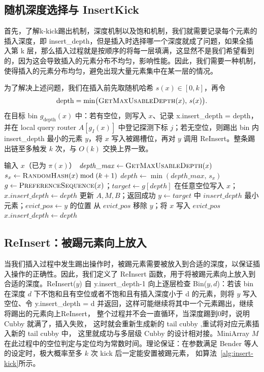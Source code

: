 \subsection{随机深度选择与 InsertKick}

首先，了解k-kick踢出机制，深度机制以及饱和机制，我们就需要记录每个元素的插入深度，即 insert\_depth，但是插入时选择哪一个深度就成了问题，如果全插入第 k 层，那么插入过程就是按顺序的将每一层填满，这显然不是我们希望看到的，因为这会导致插入的元素分布不均匀，影响性能。因此，我们需要一种机制，使得插入的元素分布均匀，避免出现大量元素集中在某一层的情况。

为了解决上述问题，我们在插入前先取随机哈希 \(s(x)\in[0,k]\)，再令
\[
  \mathrm{depth}=\min\bigl(\Call{GetMaxUsableDepth}{x},\,s(x)\bigr).
\]
在目标 bin \(g_{\mathrm{depth}}(x)\) 中：若有空位，则写入 \(x\)、记录 x.insert\_depth = depth，并在 local query router \(A[g_I(x)]\) 中登记探测下标 \(j\)；若无空位，则踢出 bin 内 insert\_depth 最小的元素 \(y\)，将 \(x\) 写入被踢槽位，再对 \(y\) 调用 ReInsert。整条踢出链至多触发 \(k\) 次，与 \(O(k)\) 交换上界一致\cite{bender2022otsh}。

\begin{algorithm}[htbp]
  \caption{InsertKick：k-kick 插入}
  \label{alg:insert-kick}
  \begin{algorithmic}[1]
    \State 输入 $x$（已为 $\pi(x)$）
    \State $\mathit{depth\_max}\gets \Call{GetMaxUsableDepth}{x}$
    \State $s_x\gets\Call{RandomHash}{x}\bmod(k+1)$
    \State $\mathit{depth}\gets\min(\mathit{depth\_max},\,s_x)$
    \State $g\gets\Call{PreferenceSequence}{x}$；$\mathit{target}\gets g[\mathit{depth}]$
      \State 在任意空位写入 $x$；$x.insert\_depth\gets\mathit{depth}$
      \State 更新 $A,M,B$；返回成功
    \Else
      \State $y\gets\mathit{target}$ 中 $insert\_depth$ 最小元素；$\mathit{evict\_pos}\gets y$ 的位置
      \State 从 $\mathit{evict\_pos}$ 移除 $y$；将 $x$ 写入 $\mathit{evict\_pos}$
      \State $x.insert\_depth\gets\mathit{depth}$
      \State {}
    \EndIf
  \end{algorithmic}
\end{algorithm}

\subsection{ReInsert：被踢元素向上放入}

当我们插入过程中发生踢出操作时，被踢元素需要被放入到合适的深度，以保证插入操作的正确性。因此，我们定义了 ReInsert 函数，用于将被踢元素向上放入到合适的深度。ReInsert(\(y\)) 自 y.insert\_depth-1 向上逐层检查 Bin(\(y,d\))：若该 bin 在深度 \(d\) 下不饱和且有空位或者不饱和且有插入深度小于 d 的元素，则将 \(y\) 写入空位、令 y.insert\_depth = d 并返回，这样可能继续将其中一个元素踢出，继续将踢出的元素向上ReInsert， 整个过程并不会一直循环，当深度踢到0时，说明 Cubby 就满了，插入失败， 这时就会重新生成新的 tail cubby ,重试将对应元素插入新的 tail cubby 中， 这里就成功与多层级 Cubby 的设计相对接。MiniArray \(M\) 在此过程中的空位判定与定位均为常数时间。理论保证：在参数满足 Bender 等人\cite{bender2022otsh} 的设定时，极大概率至多 \(k\) 次 kick 后一定能安置被踢元素， 如算法~\ref{alg:insert-kick}所示。

